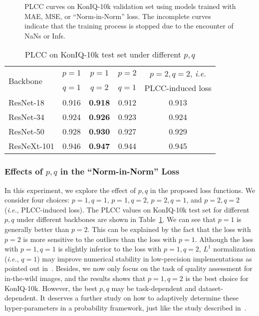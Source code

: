 \documentclass[sigconf]{acmart}
\begin{document}
\begin{figure*}[!htb]
    \centering
    \hfill
    \hfill
    \caption{PLCC curves on KonIQ-10k validation set using models trained with MAE, MSE, or ``Norm-in-Norm'' loss. The incomplete curves indicate that the training process is stopped due to the encounter of NaNs or Infs.}
    \label{fig:sensitivity}
\end{figure*}

\begin{table}[!htb]
\centering
\caption{PLCC on KonIQ-10k test set under different $p,q$}
\label{tab:pq}
\begin{tabular}{lcccc}  
\toprule
\multirow{2}{*}{Backbone}  & $p=1$ & $p=1$ & $p=2$ & $p=2,q=2$, \textit{i.e.} \\ 
& $q=1$ & $q=2$ & $q=1$ & PLCC-induced loss \\
\midrule
ResNet-18   & 0.916 & \textbf{0.918} & 0.912 & 0.913 \\
ResNet-34   & 0.924 & \textbf{0.926} & 0.923 & 0.924 \\
ResNet-50   & 0.928 & \textbf{0.930} & 0.927 & 0.929 \\
ResNeXt-101 & 0.946 & \textbf{0.947} & 0.944 & 0.945 \\
\bottomrule
\end{tabular}
\end{table}

\subsubsection{Effects of $p, q$ in the ``Norm-in-Norm'' Loss} 
In this experiment, we explore the effect of $p,q$ in the proposed loss functions.
We consider four choices: $p=1,q=1$, $p=1,q=2$, $p=2,q=1$, and $p=2,q=2$ (\textit{i.e.}, PLCC-induced loss).
The PLCC values on KonIQ-10k test set for different $p,q$ under different backbones are shown in Table~\ref{tab:pq}.
We can see that $p=1$ is generally better than $p=2$.
This can be explained by the fact that the loss with $p=2$ is more sensitive to the outliers than the loss with $p=1$.
Although the loss with $p=1,q=1$ is slightly inferior to the loss with $p=1,q=2$, $L^1$ normalization (\textit{i.e.}, $q=1$) may improve numerical stability in low-precision implementations as pointed out in~\cite{hoffer2018norm}.
Besides, we now only focus on the task of quality assessment for in-the-wild images, and the results shows that $p=1, q=2$ is the best choice for KonIQ-10k.
However, the best $p,q$ may be task-dependent and dataset-dependent.
It deserves a further study on how to adaptively determine these hyper-parameters in a probability framework, just like the study described in~\cite{barron2019general}.
\end{document}
